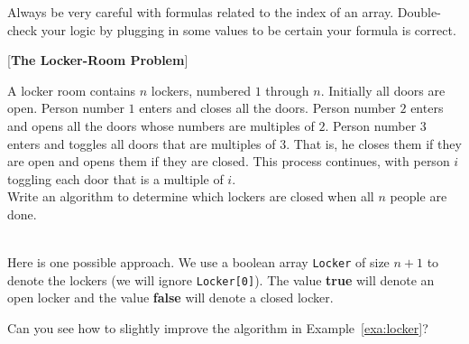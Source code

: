 \begin{rem}
Always be very careful with formulas related to the index of an array.  
Double-check your logic by plugging in some values to be certain your formula is correct.
\end{rem}

\begin{exa}\label{exa:locker}[{\bf The Locker-Room Problem}] 

A locker room contains $n$ lockers, numbered $1$ through $n$.
Initially all doors are open. Person number $1$ enters and closes all the doors. Person number $2$ enters and opens all the doors
whose numbers are multiples of $2$.
 Person number $3$ enters and toggles all doors that are multiples of $3$.  That is, he closes them if they are
open and opens them if they are closed. 
This process continues, with person $i$ toggling each door that is a multiple of $i$.\\

Write an algorithm to determine
which lockers are closed when all $n$ people are done.
\begin{sol} \ \\
Here is one possible approach. We use a boolean array {\tt Locker} of size $n+1$ to denote the lockers (we will ignore \verb|Locker[0]|).  The value {\bf true} will denote an open
locker and the value {\bf false} will denote a closed
locker.\\

\end{sol}
\end{exa}
Can you see how to slightly improve the algorithm in Example~\ref{exa:locker}? 


